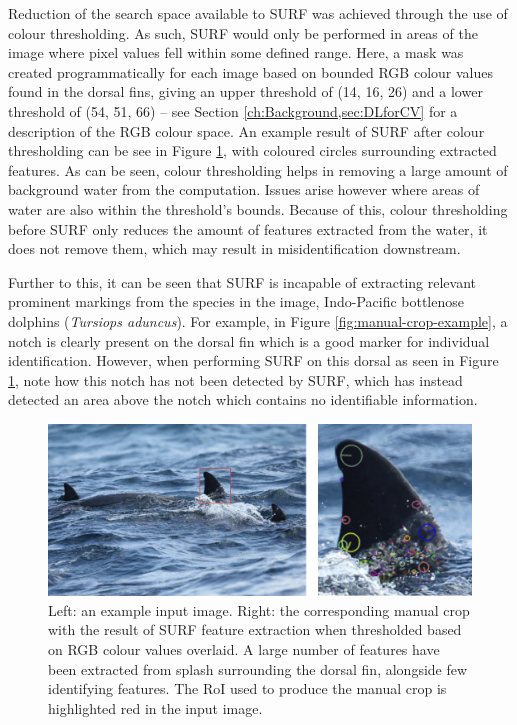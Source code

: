 Reduction of the search space available to SURF was achieved through the use of colour thresholding. As such, SURF would only be performed in areas of the image where pixel values fell within some defined range. Here, a mask was created programmatically for each image based on bounded RGB colour values found in the dorsal fins, giving an upper threshold of (14, 16, 26) and a lower threshold of (54, 51, 66) -- see Section \ref{ch:Background,sec:DLforCV} for a description of the RGB colour space. An example result of SURF after colour thresholding can be see in Figure \ref{fig:manual-crop-surf-colour-thresholding-example}, with coloured circles surrounding extracted features. As can be seen, colour thresholding helps in removing a large amount of background water from the computation. Issues arise however where areas of water are also within the threshold's bounds. Because of this, colour thresholding before SURF only reduces the amount of features extracted from the water, it does not remove them, which may result in misidentification downstream.

Further to this, it can be seen that SURF is incapable of extracting relevant prominent markings from the species in the image, Indo-Pacific bottlenose dolphins (\textit{Tursiops aduncus}). For example, in Figure \ref{fig:manual-crop-example}, a notch is clearly present on the dorsal fin which is a good marker for individual identification. However, when performing SURF on this dorsal as seen in Figure \ref{fig:manual-crop-surf-colour-thresholding-example}, note how this notch has not been detected by SURF, which has instead detected an area above the notch which contains no identifiable information. 

\begin{figure}
	\begin{center}
		\includegraphics[scale=0.6]{Chapter3/figs/manual-crop-surf-colour-thresholding-axis.png}
	\end{center}
	\caption[Left: an example input image. Right: the corresponding manual crop with the result of SURF feature extraction when thresholded based on RGB colour values overlaid.]{Left: an example input image. Right: the corresponding manual crop with the result of SURF feature extraction when thresholded based on RGB colour values overlaid. A large number of features have been extracted from splash surrounding the dorsal fin, alongside few identifying features. The RoI used to produce the manual crop is highlighted red in the input image.
	}
	\label{fig:manual-crop-surf-colour-thresholding-example}
\end{figure}

